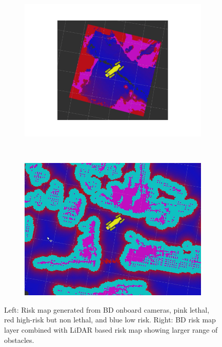 \documentclass[a4paper, 10pt, conference]{ieeeconf}      %
\begin{document}
\begin{figure}[thpb]
   \centering
    \begin{subfigure}{0.5\linewidth}
        \centering
        \includegraphics[trim={4cm 3cm 4cm 3.5cm},clip, width=\linewidth]{spot_iros/graphics/costmap_bd2.png}
    \end{subfigure}%
    ~
    \begin{subfigure}{0.5\linewidth}
        \centering
        \includegraphics[trim={1cm 1cm 1cm 1cm},clip, width=\linewidth]{spot_iros/graphics/costmap_bd2_embedded.png}
    \end{subfigure}
    \label{bd_costmap}
    \caption{Left:  Risk map generated from BD onboard cameras, pink lethal, red high-risk but non lethal, and blue low risk.  Right:  BD risk map layer combined with LiDAR based risk map showing larger range of obstacles.}
\end{figure}
\end{document}
